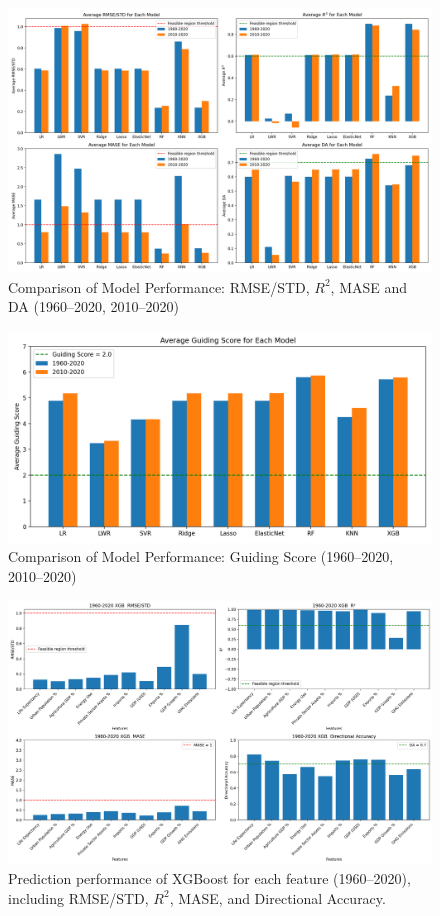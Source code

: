 \documentclass[12pt]{article}
\begin{document}
\begin{figure}[h]
    \centering
    \includegraphics[width = \linewidth]{Combined_Metrics_figure1.png}
    
    \caption{Comparison of Model Performance: RMSE/STD, $R^2$, MASE and DA (1960–2020, 2010–2020)}
    \label{fig:model_compare_1}
\end{figure}
\begin{figure}[H]
    \centering
    \includegraphics[width = \linewidth]{Average_GuidingScore_figure2.png}
    \caption{Comparison of Model Performance: Guiding Score (1960–2020, 2010–2020)}
    \label{fig:model_compare_2}
\end{figure}
\begin{figure}[H]
    \centering
    \includegraphics[width=\textwidth]{1960_2020_XGB_metrics.png}
    \caption{Prediction performance of XGBoost for each feature (1960--2020), including RMSE/STD, $R^2$, MASE, and Directional Accuracy.}
    \label{fig:xgb_feature_summary}
\end{figure}
\end{document}
